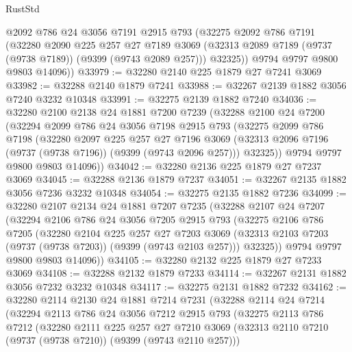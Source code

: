 \begin{lexlean}{RustStd}
\begin{coremodule}
        @2092
        @786
        @24
        @3056
        @7191
        @2915
        @793
        (@32275
          @2092
          @786
          @7191
          (@32280
            @2090
            @225
            @257
            @27
            @7189
            @3069
            (@32313 @2089 @7189 (@9737 (@9738 @7189)) (@9399 (@9743 @2089 @257)))
            @32325))
        @9794
        @9797
        @9800
        @9803
        @14096))
@33979 := @32280 @2140 @225 @1879 @27 @7241 @3069
@33982 := @32288 @2140 @1879 @7241
@33988 := @32267 @2139 @1882 @3056 @7240 @3232 @10348
@33991 := @32275 @2139 @1882 @7240
@34036 := @32280
    @2100
    @2138
    @24
    @1881
    @7200
    @7239
    (@32288
      @2100
      @24
      @7200
      (@32294
        @2099
        @786
        @24
        @3056
        @7198
        @2915
        @793
        (@32275
          @2099
          @786
          @7198
          (@32280
            @2097
            @225
            @257
            @27
            @7196
            @3069
            (@32313 @2096 @7196 (@9737 (@9738 @7196)) (@9399 (@9743 @2096 @257)))
            @32325))
        @9794
        @9797
        @9800
        @9803
        @14096))
@34042 := @32280 @2136 @225 @1879 @27 @7237 @3069
@34045 := @32288 @2136 @1879 @7237
@34051 := @32267 @2135 @1882 @3056 @7236 @3232 @10348
@34054 := @32275 @2135 @1882 @7236
@34099 := @32280
    @2107
    @2134
    @24
    @1881
    @7207
    @7235
    (@32288
      @2107
      @24
      @7207
      (@32294
        @2106
        @786
        @24
        @3056
        @7205
        @2915
        @793
        (@32275
          @2106
          @786
          @7205
          (@32280
            @2104
            @225
            @257
            @27
            @7203
            @3069
            (@32313 @2103 @7203 (@9737 (@9738 @7203)) (@9399 (@9743 @2103 @257)))
            @32325))
        @9794
        @9797
        @9800
        @9803
        @14096))
@34105 := @32280 @2132 @225 @1879 @27 @7233 @3069
@34108 := @32288 @2132 @1879 @7233
@34114 := @32267 @2131 @1882 @3056 @7232 @3232 @10348
@34117 := @32275 @2131 @1882 @7232
@34162 := @32280
    @2114
    @2130
    @24
    @1881
    @7214
    @7231
    (@32288
      @2114
      @24
      @7214
      (@32294
        @2113
        @786
        @24
        @3056
        @7212
        @2915
        @793
        (@32275
          @2113
          @786
          @7212
          (@32280
            @2111
            @225
            @257
            @27
            @7210
            @3069
            (@32313 @2110 @7210 (@9737 (@9738 @7210)) (@9399 (@9743 @2110 @257)))

\end{coremodule}
\end{lexlean}
